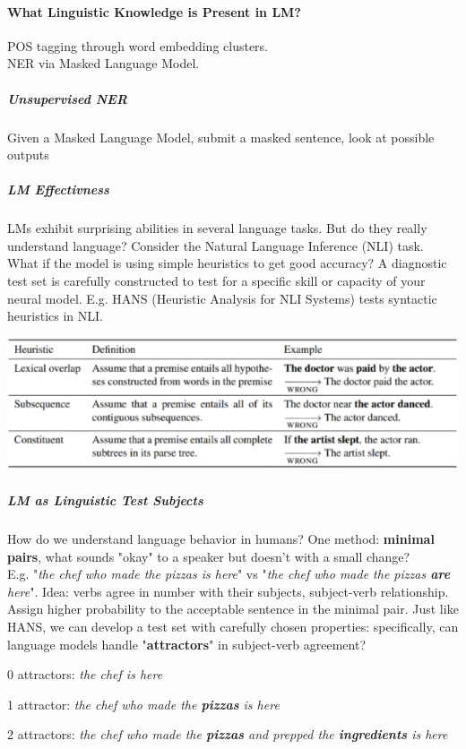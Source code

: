 \documentclass[10pt]{report}
\begin{document}
\paragraph{What Linguistic Knowledge is Present in LM?} POS tagging through word embedding clusters.\\
NER via Masked Language Model.
\subparagraph{Unsupervised NER} Given a Masked Language Model, submit a masked sentence, look at possible outputs
\subparagraph{LM Effectivness} LMs exhibit surprising abilities in several language tasks. But do they really understand language? Consider the Natural Language Inference (NLI) task.
What if the model is using simple heuristics to get good accuracy? A diagnostic test set is carefully constructed to test for a specific skill or capacity of your neural model. E.g. HANS (Heuristic Analysis for NLI Systems) tests syntactic heuristics in NLI.
\begin{center}
	\includegraphics[scale=0.5]{78.png}
\end{center}
\subparagraph{LM as Linguistic Test Subjects} How do we understand language behavior in humans? One method: \textbf{minimal pairs}, what sounds "okay" to a speaker but doesn't with a small change?\\
E.g. "\textit{the chef who made the pizzas is here}" vs "\textit{the chef who made the pizzas \textbf{are} here}". Idea: verbs agree in number with their subjects, subject-verb relationship.\\
Assign higher probability to the acceptable sentence in the minimal pair. Just like HANS, we can develop a test set with carefully chosen properties: specifically, can language models handle "\textbf{attractors}" in subject-verb agreement?
\begin{list}{}{}
	\item 0 attractors: \textit{the chef is here}
	\item 1 attractor: \textit{the chef who made the \textbf{pizzas} is here}
	\item 2 attractors: \textit{the chef who made the \textbf{pizzas} and prepped the \textbf{ingredients} is here}
\end{list}
\end{document}
